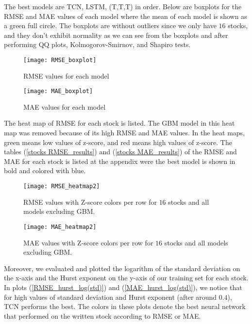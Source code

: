 \documentclass[12pt, A4]{article}
\begin{document}
The best models are TCN, LSTM, (T,T,T) in order. Below are boxplots for the RMSE and MAE values of each model where the mean of each model is shown as a green full circle. The boxplots are without outliers since we only have $16$ stocks, and they don't exhibit normality as we can see from the boxplots and after performing QQ plots, Kolmogorov-Smirnov, and Shapiro tests. 

\begin{figure}[H]
	\centering
	\texttt{[image: RMSE\_boxplot]}
	\caption{RMSE values for each model}
	\label{RMSE_boxplot}
\end{figure}

\begin{figure}[H]
	\centering
	\texttt{[image: MAE\_boxplot]}
	\caption{MAE values for each model}
	\label{MAE_boxplot}
\end{figure}


The heat map of RMSE for each stock is listed. The GBM model in this heat map was removed because of its high RMSE and MAE values. In the heat maps, green means low values of z-score, and red means high values of z-score. The tables (\ref{stocks RMSE_results}) and (\ref{stocks MAE_results}) of the RMSE and MAE for each stock is listed at the appendix were the best model is shown in bold and colored with blue.

\begin{figure}[H]
	\centering
	\texttt{[image: RMSE\_heatmap2]}
	\caption{RMSE values with Z-score colors per row for $16$ stocks and all models excluding GBM.}
	\label{RMSE_heatmap}
\end{figure}

\begin{figure}[H]
	\centering
	\texttt{[image: MAE\_heatmap2]}
	\caption{MAE values with Z-score colors per row for $16$ stocks and all models excluding GBM.}
	\label{MAE_heatmap}
\end{figure}

Moreover, we evaluated and plotted the logarithm of the standard deviation on the x-axis and the Hurst exponent on the y-axis of our training set for each stock. In plots (\ref{RMSE_hurst_log(std)}) and (\ref{MAE_hurst_log(std)}), we notice that for high values of standard deviation and Hurst exponent (after around $0.4$), TCN performs the best. The colors in these plots denote the best neural network that performed on the written stock according to RMSE or MAE.
\end{document}
